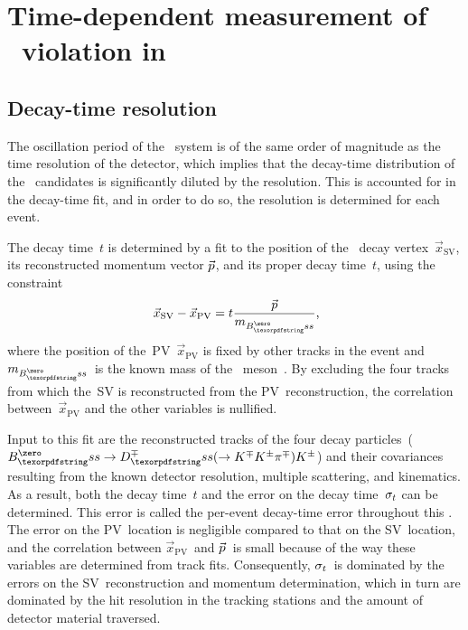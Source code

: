 \chapter[\CP~violation in \BsDsK]{Time-dependent measurement of \CP~violation in~\BsDsK}
\label{chp:BsDsK_TD}

\vspace*{\fill}
\minitoc

\clearpage
\section{Decay-time resolution} \label{sec:BsDsK_TD_Res}

The oscillation period of the \Bs~system is of the same order of magnitude as the time resolution of the detector, which implies that the decay-time distribution of the \Bs~candidates is significantly diluted by the resolution.
This is accounted for in the decay-time fit, and in order to do so, the resolution is determined for each event.

The decay time~\(t\) is determined by a fit to the position of the \Bs~decay vertex~\(\vec{x}_\text{SV}\), its reconstructed momentum vector \(\vec{\mbox{\ensuremath{p}}}\), and its proper decay time~\(t\), using the constraint
%
\begin{equation}
    \vec{x}_{\text{SV}} - \vec{x}_{\text{PV}} = t \dfrac{\vec{\ptot}}{m_{\Bs}} \rlap{,}
\end{equation}
%
where the position of the~PV~\(\vec{x}_{\text{PV}}\) is fixed by other tracks in the event and \(m_{\Bs}\)~is the known mass of the \Bs~meson~\cite{PDG}.
By excluding the four tracks from which the~SV is reconstructed from the PV~reconstruction, the correlation between~\(\vec{x}_{\text{PV}}\) and the other variables is nullified.

Input to this fit are the reconstructed tracks of the four decay particles~(\({\decay{\Bs}{\Dsmp(\to\KmpKPi)\Kpm}}\)) and their covariances resulting from the known detector resolution, multiple scattering, and kinematics.
As a result, both the decay time~\(t\) and the error on the decay time~\(\sigma_{t}\) can be determined.
This error is called the per-event decay-time error throughout this .
The error on the PV~location is negligible compared to that on the SV~location, and the correlation between \(\vec{x}_{\text{PV}}\)~and \(\vec{\mbox{\ensuremath{p}}}\)~is small because of the way these variables are determined from track fits.
Consequently, \(\sigma_{t}\)~is dominated by the errors on the SV~reconstruction and momentum determination, which in turn are dominated by the hit resolution in the tracking stations and the amount of detector material traversed.

